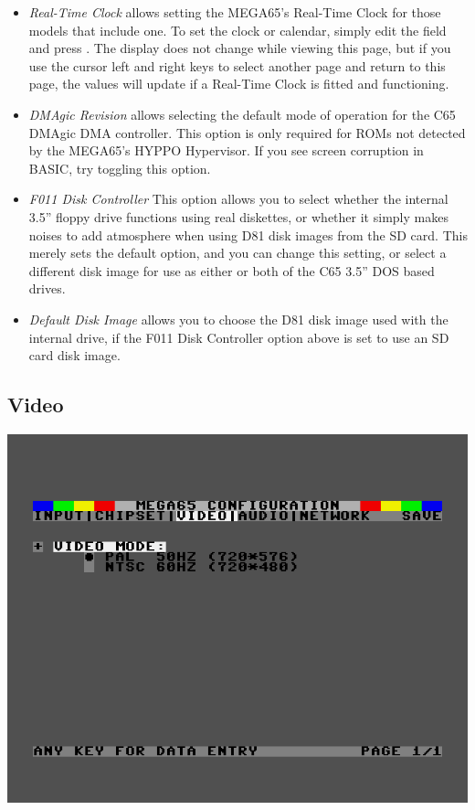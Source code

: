 \begin{itemize}
  \item{\em Real-Time Clock} allows setting the MEGA65's Real-Time
    Clock for those models that include one.  To set the clock or
    calendar, simply edit the field and press .
    The display does not change while viewing this page, but if
    you use the cursor left and right keys to select another page and
    return to this page, the values will update if a Real-Time Clock
    is fitted and functioning.
  \item{\em DMAgic Revision} allows selecting the default mode of
    operation for the C65 DMAgic DMA controller.  This option is only
    required for ROMs not detected by the MEGA65's HYPPO Hypervisor.
    If you see screen corruption in BASIC,
    try toggling this option.
  \item{\em F011 Disk Controller}
    This option allows you to select whether the internal 3.5'' floppy
    drive functions using real diskettes, or whether it simply makes
    noises to add atmosphere when using D81 disk images from the SD
    card.  This merely sets the default option, and you can change
    this setting, or select a different disk image for use as either
    or both of the C65 3.5'' DOS based drives.
  \item{\em Default Disk Image} allows you to choose the D81 disk image
    used with the internal drive, if the F011 Disk
    Controller option above is set to use an SD card disk image.
\end{itemize}

\subsection{Video}

\begin{center}
\includegraphics[width=0.7\linewidth]{images/ss-m65config-3.png}
\end{center}

